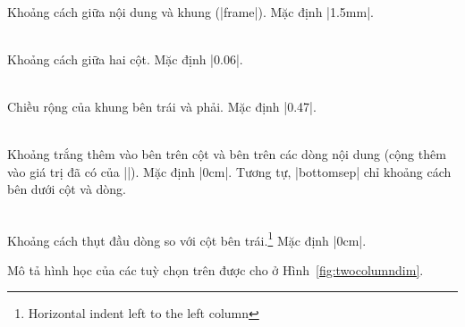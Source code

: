 \begin{description}
\item{}\\
Khoảng cách giữa nội dung và khung (|frame|). Mặc định |1.5mm|.
\item{}\\
Khoảng cách giữa hai cột. Mặc định |0.06\linewidth|.
\item{} \\
Chiều rộng của khung bên trái và phải. Mặc định |0.47\linewidth|.
\item{} \\
Khoảng trắng thêm vào bên trên cột và bên trên các dòng nội dung
(cộng thêm vào giá trị đã có của |\baselineskip|). Mặc định |0cm|.
Tương tự, |bottomsep| chỉ khoảng cách bên dưới cột và dòng.
\item{}\\
Khoảng cách thụt đầu dòng so với cột bên trái.\footnote{Horizontal indent left to the left column}
Mặc định |0cm|.
\end{description}
Mô tả hình học của các tuỳ chọn trên được cho ở Hình~\vref{fig:twocolumndim}.

